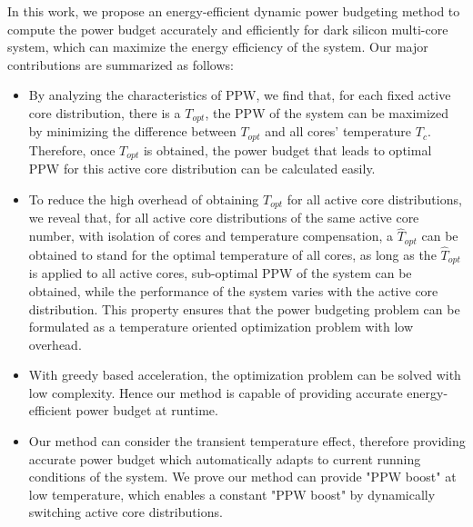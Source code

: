 In this work, we propose an energy-efficient dynamic power budgeting method to compute the power budget accurately and efficiently for dark silicon multi-core system, which can maximize the energy efficiency of the system. Our major contributions are summarized as follows:
\begin{itemize}

\item By analyzing the characteristics of PPW, we find that, for each fixed active core distribution, there is a $T_{opt}$, the PPW of the system can be maximized by minimizing the difference between $T_{opt}$ and all cores' temperature $T_{c}$. Therefore, once $T_{opt}$ is obtained, the power budget that leads to optimal PPW for this active core distribution can be calculated easily.
\item To reduce the high overhead of obtaining $T_{opt}$ for all active core distributions, we reveal that, for all active core distributions of the same active core number, with isolation of cores and temperature compensation, a $\hat{T}_{opt}$ can be obtained to stand for the optimal temperature of all cores, as long as the $\hat{T}_{opt}$ is applied to all active cores, sub-optimal PPW of the system can be obtained, while the performance of the system varies with the active core distribution. This property ensures that the power budgeting problem can be formulated as a temperature oriented optimization problem with low overhead.
\item With greedy based acceleration, the optimization problem can be solved with low complexity. Hence our method is capable of providing accurate energy-efficient power budget at runtime.
\item Our method can consider the transient temperature effect, therefore providing accurate power budget which automatically adapts to current running conditions of the system. We prove our method can provide "PPW boost" at low temperature, which enables a constant "PPW boost" by dynamically switching active core distributions.
\end{itemize} 